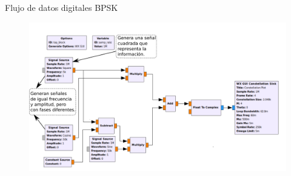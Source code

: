 \begin{frame}{Flujo de datos digitales BPSK}
\begin{figure}
\includegraphics[width=.6\textwidth]{parte1/lab5/pdf/lab5_6.pdf}
\end{figure}
\end{frame}
 